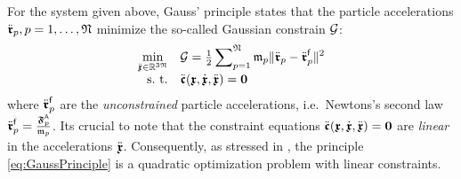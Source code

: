 For the system given above, Gauss' principle states that the particle accelerations $\particlePosdd{\PidxI}, \PidxI=1,\ldots,\numParticles$ minimize the so-called Gaussian constrain $\GaussianConstraint$:
\begin{align}\label{eq:GaussPrinciple}
 \begin{array}{rl}
  \minOp[\particleCoorddd\in\RealNum^{3\numParticles}] & \GaussianConstraint = \tfrac{1}{2} \displaystyle\sumParticlesFull \particleMass{\PidxI} \norm{\particlePosdd{\PidxI} - \particlePosdd{\PidxI}^{\idxText{f}}}^2 \\
  \text{s.\ t.} & \ddot{\particleGeoConstraint}(\particleCoord, \particleCoordd, \particleCoorddd) = \tuple{0}
 \end{array}
\end{align}
where $\particlePosdd{\PidxI}^{\idxText{f}}$ are the \textit{unconstrained} particle accelerations, i.e.\ Newtons's second law $\particlePosdd{\PidxI}^{\idxText{f}}=\tfrac{\particleForceImpressed{\PidxI}}{\particleMass{\PidxI}}$.
Its crucial to note that the constraint equations $\ddot{\particleGeoConstraint}(\particleCoord, \particleCoordd, \particleCoorddd) = \tuple{0}$ are \textit{linear} in the accelerations $\particleCoorddd$.
Consequently, as stressed in \cite{Gauss:Principle}, the principle \eqref{eq:GaussPrinciple} is a quadratic optimization problem with linear constraints.



